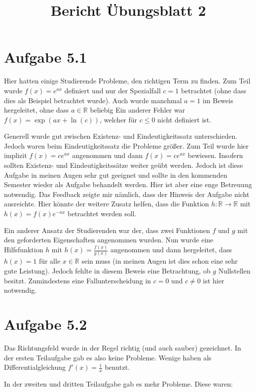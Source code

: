 \documentclass[a4paper]{article}
\title{Bericht Übungsblatt 2}
\date{}
\newcommand*{\R}{\mathbb R}
\begin{document}
\maketitle

\section{Aufgabe 5.1}

Hier hatten einige Studierende Probleme, den richtigen Term zu finden. Zum Teil wurde $f(x)=e^{ax}$ definiert und nur der Spezialfall $c=1$ betrachtet (ohne dass dies als Beispiel betrachtet wurde). Auch wurde manchmal $a=1$ im Beweis hergeleitet, ohne dass $a\in\R$ beliebig Ein anderer Fehler war $f(x)=\exp(ax+\ln(c))$, welcher für $c \le 0$ nicht definiert ist.

Generell wurde gut zwischen Existenz- und Eindeutigkeitssatz unterschieden. Jedoch waren beim Eindeutigkeitssatz die Probleme größer. Zum Teil wurde hier implizit $f(x)=ce^{ax}$ angenommen und dann $f(x)=ce^{ax}$ bewiesen. Insofern sollten Existenz- und Eindeutigkeitssätze weiter geübt werden. Jedoch ist diese Aufgabe in meinen Augen sehr gut geeignet und sollte in den kommenden Semester wieder als Aufgabe behandelt werden. Hier ist aber eine enge Betreuung notwendig. Das Feedback zeigte mir nämlich, dass der Hinweis der Aufgabe nicht ausreichte. Hier könnte der weitere Zusatz helfen, dass die Funktion $h:\R\to\R$ mit $h(x)=f(x)e^{-ax}$ betrachtet werden soll.

Ein anderer Ansatz der Studierenden war der, dass zwei Funktionen $f$ und $g$ mit den geforderten Eigenschaften angenommen wurden. Nun wurde eine Hilfsfunktion $h$ mit $h(x)=\frac{f(x)}{g(x)}$ angenommen und dann hergeleitet, dass $h(x)=1$ für alle $x\in\R$ sein muss (in meinen Augen ist dies schon eine sehr gute Leistung). Jedoch fehlte in diesem Beweis eine Betrachtung, ob $g$ Nullstellen besitzt. Zumindestens eine Fallunterscheidung in $c=0$ und $c\neq 0$ ist hier notwendig.

\section{Aufgabe 5.2}

Das Richtungsfeld wurde in der Regel richtig (und auch sauber) gezeichnet. In der ersten Teilaufgabe gab es also keine Probleme. Wenige haben als Differentialgleichung $f'(x)=\frac{1}{x}$ benutzt.

In der zweiten und dritten Teilaufgabe gab es mehr Probleme. Diese waren:
\end{document}
